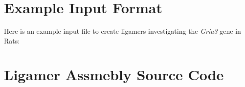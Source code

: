 \section{Example Input Format}

\begin{landscape}
Here is an example input file to create ligamers investigating the \textit{Gria3} gene in Rats:

\end{landscape}


\section{Ligamer Assmebly Source Code}\label{apx: Ligamer Assmembler}

